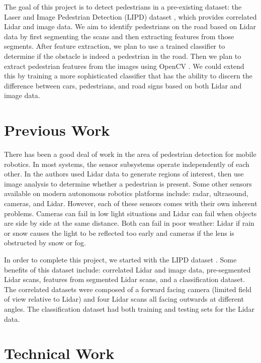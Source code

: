 \documentclass[10pt,twocolumn,letterpaper]{article}
\begin{document}
  The goal of this project is to detect pedestrians in a pre-existing dataset:
  the Laser and Image Pedestrian Detection (LIPD) dataset \cite{dataset},
  which provides correlated Lidar and image data. We aim to identify pedestrians
  on the road based on Lidar data by first segmenting the scans and then
  extracting features from those segments.
  After feature extraction, we plan to use a trained classifier to determine
  if the obstacle is indeed a pedestrian in the road. Then we plan to extract
  pedestrian features from the images using OpenCV \cite{opencv}. We could extend this by
  training a more sophisticated classifier that has the ability to discern the
  difference between cars, pedestrians, and road signs based on both Lidar
  and image data.

\section{Previous Work}

  There has been a good deal of work in the area of pedestrian detection for
  mobile robotics. In most systems, the sensor subsystems operate independently
  of each other. In \cite{journal} the authors used Lidar data to generate regions
  of interest, then use image analysis to determine whether a pedestrian is
  present. Some other sensors available on modern autonomous robotics
  platforms include: radar, ultrasound, cameras, and Lidar. However,
  each of these sensors comes with their own
  inherent problems. Cameras can fail in low light situations and Lidar can
  fail when objects are side by side at the same distance. Both can fail in poor
  weather: Lidar if rain or snow causes the light to be reflected
  too early and cameras if the lens is obstructed by snow or fog.

  In order to complete this project, we started with the LIPD dataset \cite{dataset}.
  Some benefits of this dataset include: correlated Lidar and image data, pre-segmented
  Lidar scans, features from segmented Lidar scans, and
  a classification dataset. The correlated datasets were composed of a forward
  facing camera (limited field of view relative to Lidar) and four Lidar scans
  all facing outwards at different angles. The classification dataset had both
  training and testing sets for the Lidar data.


\section{Technical Work}
\end{document}
